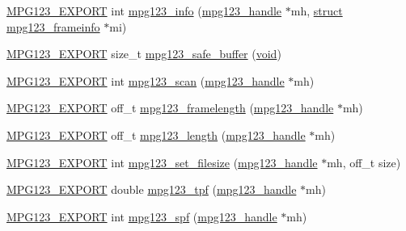 \begin{DoxyCompactItemize}
\item 
\hyperlink{mpg123_8h_a2ba98cfba3f760879df70e755b2a61cc}{M\+P\+G123\+\_\+\+E\+X\+P\+O\+RT} int \hyperlink{group__mpg123__status_ga2f3357b968c78a77ad456a3200820ba8}{mpg123\+\_\+info} (\hyperlink{group__mpg123__init_ga6728e2839a395f3a07d4514da659faca}{mpg123\+\_\+handle} $\ast$mh, \hyperlink{interfacestruct}{struct} \hyperlink{structmpg123__frameinfo}{mpg123\+\_\+frameinfo} $\ast$mi)
\item 
\hyperlink{mpg123_8h_a2ba98cfba3f760879df70e755b2a61cc}{M\+P\+G123\+\_\+\+E\+X\+P\+O\+RT} size\+\_\+t \hyperlink{group__mpg123__status_gafdb7e99795ac9915f47d0e1985ce3968}{mpg123\+\_\+safe\+\_\+buffer} (\hyperlink{interfacevoid}{void})
\item 
\hyperlink{mpg123_8h_a2ba98cfba3f760879df70e755b2a61cc}{M\+P\+G123\+\_\+\+E\+X\+P\+O\+RT} int \hyperlink{group__mpg123__status_ga229cf48b0e7020403e423824f6b9ac2c}{mpg123\+\_\+scan} (\hyperlink{group__mpg123__init_ga6728e2839a395f3a07d4514da659faca}{mpg123\+\_\+handle} $\ast$mh)
\item 
\hyperlink{mpg123_8h_a2ba98cfba3f760879df70e755b2a61cc}{M\+P\+G123\+\_\+\+E\+X\+P\+O\+RT} off\+\_\+t \hyperlink{group__mpg123__status_gabf4a6c8f3b251acfa05fd7737a076370}{mpg123\+\_\+framelength} (\hyperlink{group__mpg123__init_ga6728e2839a395f3a07d4514da659faca}{mpg123\+\_\+handle} $\ast$mh)
\item 
\hyperlink{mpg123_8h_a2ba98cfba3f760879df70e755b2a61cc}{M\+P\+G123\+\_\+\+E\+X\+P\+O\+RT} off\+\_\+t \hyperlink{group__mpg123__status_ga7a97295f5dd82795489d9ed8ee544805}{mpg123\+\_\+length} (\hyperlink{group__mpg123__init_ga6728e2839a395f3a07d4514da659faca}{mpg123\+\_\+handle} $\ast$mh)
\item 
\hyperlink{mpg123_8h_a2ba98cfba3f760879df70e755b2a61cc}{M\+P\+G123\+\_\+\+E\+X\+P\+O\+RT} int \hyperlink{group__mpg123__status_gad0301e80dbc3f48e47e27d39cd328755}{mpg123\+\_\+set\+\_\+filesize} (\hyperlink{group__mpg123__init_ga6728e2839a395f3a07d4514da659faca}{mpg123\+\_\+handle} $\ast$mh, off\+\_\+t size)
\item 
\hyperlink{mpg123_8h_a2ba98cfba3f760879df70e755b2a61cc}{M\+P\+G123\+\_\+\+E\+X\+P\+O\+RT} double \hyperlink{group__mpg123__status_ga6edf9556db430445dac2434ed5306a12}{mpg123\+\_\+tpf} (\hyperlink{group__mpg123__init_ga6728e2839a395f3a07d4514da659faca}{mpg123\+\_\+handle} $\ast$mh)
\item 
\hyperlink{mpg123_8h_a2ba98cfba3f760879df70e755b2a61cc}{M\+P\+G123\+\_\+\+E\+X\+P\+O\+RT} int \hyperlink{group__mpg123__status_ga361e1b936b6dca126ba46e06e06fcc53}{mpg123\+\_\+spf} (\hyperlink{group__mpg123__init_ga6728e2839a395f3a07d4514da659faca}{mpg123\+\_\+handle} $\ast$mh)

\end{DoxyCompactItemize}
